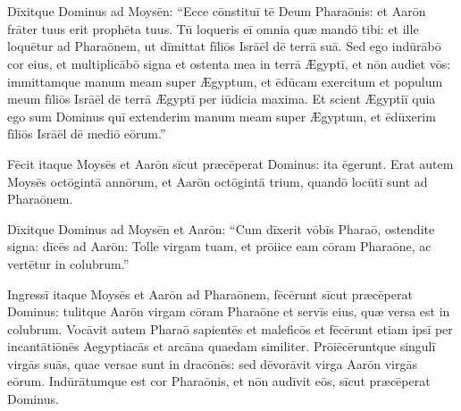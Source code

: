 \chapter{}


\thispagestyle{empty}

Dīxitque Dominus ad Moysēn: ``Ecce cōnstituī tē Deum
Pharaōnis: et Aarōn frāter tuus erit
prophēta tuus. Tū loqueris eī omnia quæ
mandō tibi: et ille loquētur ad Pharaōnem,
ut dīmittat fīliōs Isrāēl dē terrā suā. Sed ego
indūrābō cor eius, et
multiplicābō signa et ostenta mea
in terrā Ægyptī, et nōn audiet vōs: immittamque manum meam super Ægyptum, et ēdūcam exercitum et
populum meum fīliōs Isrāēl dē terrā Ægyptī per
iūdicia maxima. Et scient Ægyptiī quia ego sum Dominus
quī extenderim manum meam super Ægyptum, et ēdūxerim fīliōs
Isrāēl dē mediō eōrum.''

Fēcit itaque
Moysēs et Aarōn sīcut præcēperat
Dominus: ita ēgerunt. Erat autem Moysēs octōgintā
annōrum, et Aarōn octōgintā trium, quandō locūtī sunt ad
Pharaōnem.

Dīxitque Dominus ad Moysēn et
Aarōn: ``Cum dīxerit vōbīs Pharaō, ostendite signa: dīcēs
ad Aarōn: Tolle virgam tuam, et prōiice eam cōram
Pharaōne, ac vertētur in colubrum.''

Ingressī itaque Moysēs et Aarōn ad Pharaōnem, fēcērunt sīcut
præcēperat Dominus: tulitque Aarōn virgam cōram
Pharaōne et servīs eius, quæ versa est in
colubrum. Vocāvit autem Pharaō sapientēs
et maleficōs et fēcērunt etiam ipsī per
incantātiōnēs Aegyptiacās et
arcāna quaedam similiter. Prōiēcēruntque
singulī virgās suās, quae versae sunt in dracōnēs: sed
dēvorāvit virga Aarōn virgās eōrum.  Indūrātumque est cor Pharaōnis, et nōn audīvit eōs,
sīcut præcēperat Dominus.

